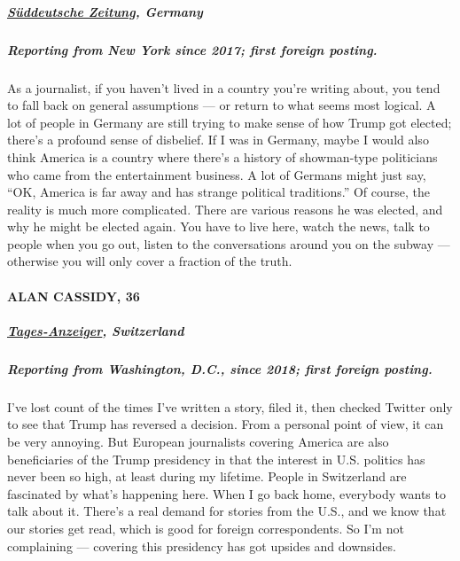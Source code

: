 \hypertarget{suxfcddeutsche-zeitung-germany}{%
\subparagraph{\texorpdfstring{\textbf{\href{https://www.sueddeutsche.de/}{Süddeutsche
Zeitung},
Germany}}{Süddeutsche Zeitung, Germany}}\label{suxfcddeutsche-zeitung-germany}}

\hypertarget{reporting-from-new-york-since-2017-first-foreign-posting}{%
\subparagraph{\texorpdfstring{\textbf{Reporting from New York since
2017; first foreign
posting.}}{Reporting from New York since 2017; first foreign posting.}}\label{reporting-from-new-york-since-2017-first-foreign-posting}}

As a journalist, if you haven't lived in a country you're writing about,
you tend to fall back on general assumptions --- or return to what seems
most logical. A lot of people in Germany are still trying to make sense
of how Trump got elected; there's a profound sense of disbelief. If I
was in Germany, maybe I would also think America is a country where
there's a history of showman-type politicians who came from the
entertainment business. A lot of Germans might just say, ``OK, America
is far away and has strange political traditions.'' Of course, the
reality is much more complicated. There are various reasons he was
elected, and why he might be elected again. You have to live here, watch
the news, talk to people when you go out, listen to the conversations
around you on the subway --- otherwise you will only cover a fraction of
the truth.

\hypertarget{alan-cassidy-36}{%
\paragraph{ALAN CASSIDY, 36}\label{alan-cassidy-36}}

\hypertarget{tages-anzeiger-switzerland}{%
\subparagraph{\texorpdfstring{\textbf{\href{https://www.tagesanzeiger.ch/}{Tages-Anzeiger},
Switzerland}}{Tages-Anzeiger, Switzerland}}\label{tages-anzeiger-switzerland}}

\hypertarget{reporting-from-washington-dc-since-2018-first-foreign-posting}{%
\subparagraph{\texorpdfstring{\textbf{Reporting from Washington, D.C.,
since 2018; first foreign
posting.}}{Reporting from Washington, D.C., since 2018; first foreign posting.}}\label{reporting-from-washington-dc-since-2018-first-foreign-posting}}

I've lost count of the times I've written a story, filed it, then
checked Twitter only to see that Trump has reversed a decision. From a
personal point of view, it can be very annoying. But European
journalists covering America are also beneficiaries of the Trump
presidency in that the interest in U.S. politics has never been so high,
at least during my lifetime. People in Switzerland are fascinated by
what's happening here. When I go back home, everybody wants to talk
about it. There's a real demand for stories from the U.S., and we know
that our stories get read, which is good for foreign correspondents. So
I'm not complaining --- covering this presidency has got upsides and
downsides.

